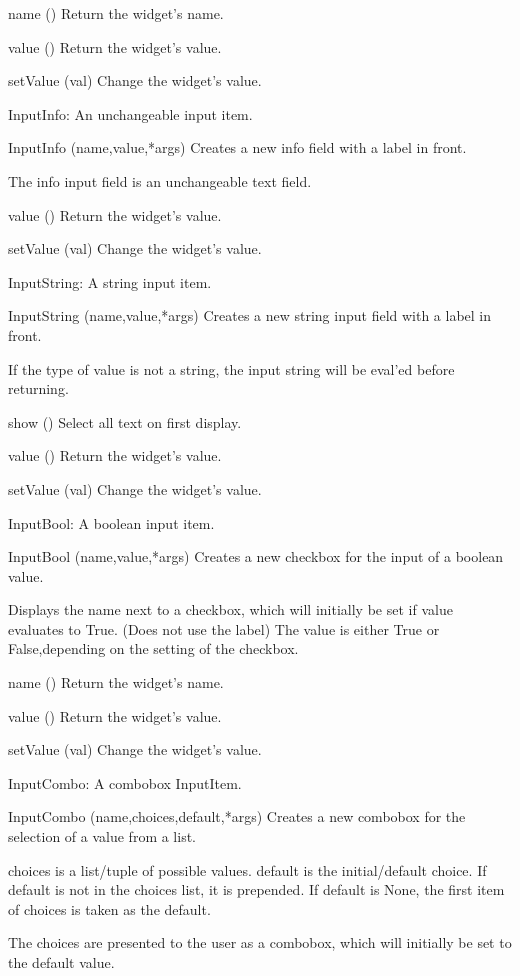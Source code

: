 name ()
Return the widget's name.

value ()
Return the widget's value.

setValue (val)
Change the widget's value.

InputInfo: An unchangeable input item.

InputInfo (name,value,*args)
Creates a new info field with a label in front.

        The info input field is an unchangeable text field.
        

value ()
Return the widget's value.

setValue (val)
Change the widget's value.

InputString: A string input item.

InputString (name,value,*args)
Creates a new string input field with a label in front.

        If the type of value is not a string, the input string
        will be eval'ed before returning.
        

show ()
Select all text on first display.

value ()
Return the widget's value.

setValue (val)
Change the widget's value.

InputBool: A boolean input item.

InputBool (name,value,*args)
Creates a new checkbox for the input of a boolean value.
        
        Displays the name next to a checkbox, which will initially be set
        if value evaluates to True. (Does not use the label)
        The value is either True or False,depending on the setting
        of the checkbox.
        

name ()
Return the widget's name.

value ()
Return the widget's value.

setValue (val)
Change the widget's value.

InputCombo: A combobox InputItem.

InputCombo (name,choices,default,*args)
Creates a new combobox for the selection of a value from a list.

        choices is a list/tuple of possible values.
        default is the initial/default choice.
        If default is not in the choices list, it is prepended.
        If default is None, the first item of choices is taken as the default.
       
        The choices are presented to the user as a combobox, which will
        initially be set to the default value.
        

